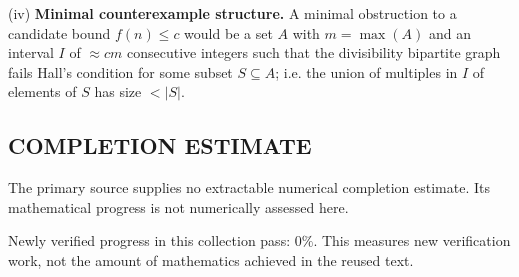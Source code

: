 (iv) \textbf{Minimal counterexample structure.}
A minimal obstruction to a candidate bound $f(n)\le c$ would be a set $A$ with $m=\max(A)$ and an interval $I$ of $\approx cm$ consecutive integers such that the divisibility bipartite graph fails Hall's condition for some subset $S\subseteq A$; i.e. the union of multiples in $I$ of elements of $S$ has size $<|S|$.




\subsection*{COMPLETION ESTIMATE}
The primary source supplies no extractable numerical completion estimate. Its mathematical progress is not numerically assessed here.

Newly verified progress in this collection pass: $0\%$. This measures new verification work, not the amount of mathematics achieved in the reused text.
